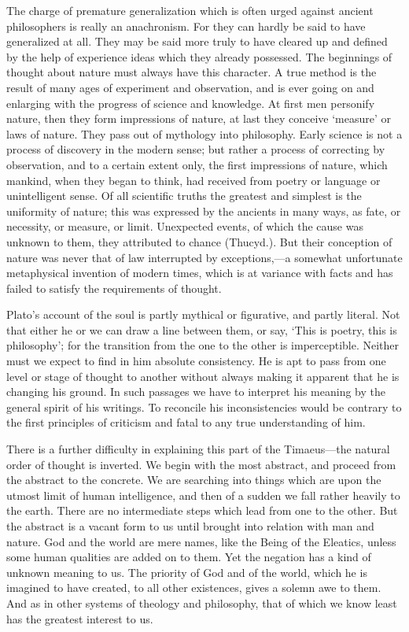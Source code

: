 The charge of premature generalization which is often urged against
ancient philosophers is really an anachronism. For they can hardly be said
to have generalized at all. They may be said more truly to have cleared up
and defined by the help of experience ideas which they already possessed.
The beginnings of thought about nature must always have this character. A
true method is the result of many ages of experiment and observation, and
is ever going on and enlarging with the progress of science and knowledge.
At first men personify nature, then they form impressions of nature, at
last they conceive ‘measure’ or laws of nature. They pass out of mythology
into philosophy. Early science is not a process of discovery in the modern
sense; but rather a process of correcting by observation, and to a certain
extent only, the first impressions of nature, which mankind, when they
began to think, had received from poetry or language or unintelligent
sense. Of all scientific truths the greatest and simplest is the
uniformity of nature; this was expressed by the ancients in many ways, as
fate, or necessity, or measure, or limit. Unexpected events, of which the
cause was unknown to them, they attributed to chance (Thucyd.). But their
conception of nature was never that of law interrupted by exceptions,—a
somewhat unfortunate metaphysical invention of modern times, which is at
variance with facts and has failed to satisfy the requirements of thought.


Plato’s account of the soul is partly mythical or figurative, and partly
literal. Not that either he or we can draw a line between them, or say,
‘This is poetry, this is philosophy’; for the transition from the one to
the other is imperceptible. Neither must we expect to find in him absolute
consistency. He is apt to pass from one level or stage of thought to
another without always making it apparent that he is changing his ground.
In such passages we have to interpret his meaning by the general spirit of
his writings. To reconcile his inconsistencies would be contrary to the
first principles of criticism and fatal to any true understanding of him.

There is a further difficulty in explaining this part of the Timaeus—the
natural order of thought is inverted. We begin with the most abstract, and
proceed from the abstract to the concrete. We are searching into things
which are upon the utmost limit of human intelligence, and then of a
sudden we fall rather heavily to the earth. There are no intermediate
steps which lead from one to the other. But the abstract is a vacant form
to us until brought into relation with man and nature. God and the world
are mere names, like the Being of the Eleatics, unless some human
qualities are added on to them. Yet the negation has a kind of unknown
meaning to us. The priority of God and of the world, which he is imagined
to have created, to all other existences, gives a solemn awe to them. And
as in other systems of theology and philosophy, that of which we know
least has the greatest interest to us.


